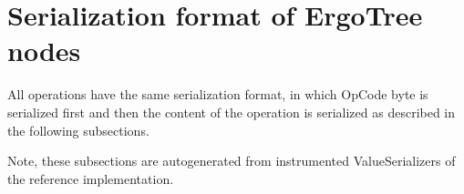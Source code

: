 \section{Serialization format of ErgoTree nodes}
\label{sec:appendix:ergotree_serialization}

All operations have the same serialization format, in which OpCode byte is serialized
first and then the content of the operation is serialized as described in the following
subsections.

Note, these subsections are autogenerated from instrumented ValueSerializers of the
reference implementation.

 
